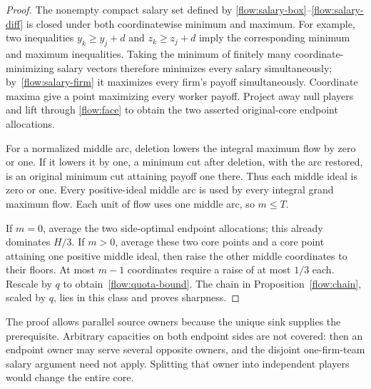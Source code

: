 \begin{proof}
The nonempty compact salary set defined by
\eqref{flow:salary-box}--\eqref{flow:salary-diff} is closed under both
coordinatewise minimum and maximum. For example, two inequalities
$y_k\ge y_j+d$ and $z_k\ge z_j+d$ imply the corresponding minimum
and maximum inequalities. Taking the minimum of finitely many
coordinate-minimizing salary vectors therefore minimizes every salary
simultaneously; by~\eqref{flow:salary-firm} it maximizes every firm's
payoff simultaneously. Coordinate maxima give a point maximizing every
worker payoff. Project away null players and lift through
\eqref{flow:face} to obtain the two asserted original-core endpoint
allocations.

For a normalized middle arc, deletion lowers the integral maximum flow
by zero or one. If it lowers it by one, a minimum cut after deletion,
with the arc restored, is an original minimum cut attaining payoff one
there. Thus each middle ideal is zero or one. Every positive-ideal
middle arc is used by every integral grand maximum flow. Each unit of
flow uses one middle arc, so $m\le T$.

If $m=0$, average the two side-optimal endpoint allocations; this already
dominates $H/3$. If $m>0$, average these two core points and a core point
attaining one positive middle ideal, then raise the other middle
coordinates to their floors. At most $m-1$ coordinates require a raise
of at most $1/3$ each. Rescale by $q$ to obtain~\eqref{flow:quota-bound}.
The chain in Proposition~\ref{flow:chain}, scaled by $q$, lies in this
class and proves sharpness.
\end{proof}
The proof allows parallel source owners because the unique sink supplies
the prerequisite. Arbitrary capacities on both endpoint sides are not
covered: then an endpoint owner may serve several opposite owners, and
the disjoint one-firm-team salary argument need not apply. Splitting
that owner into independent players would change the entire core.

